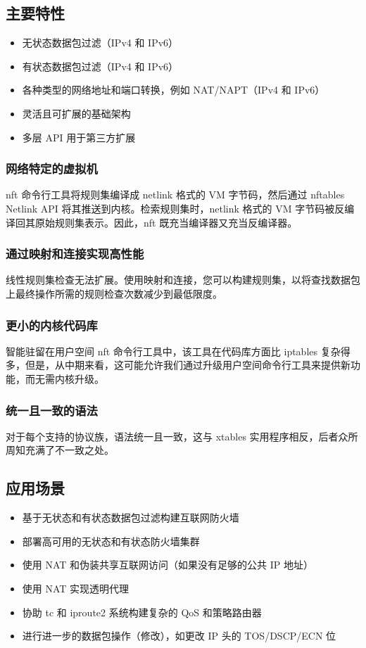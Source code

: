 \documentclass[12pt,UTF8]{ctexbook}
\begin{document}
\subsection{主要特性}
\begin{itemize}
  \item 无状态数据包过滤（IPv4 和 IPv6）
  \item 有状态数据包过滤（IPv4 和 IPv6）
  \item 各种类型的网络地址和端口转换，例如 NAT/NAPT（IPv4 和 IPv6）
  \item 灵活且可扩展的基础架构
  \item 多层 API 用于第三方扩展
\end{itemize}

\subsubsection{网络特定的虚拟机}
nft 命令行工具将规则集编译成 netlink 格式的 VM 字节码，然后通过 nftables Netlink API 将其推送到内核。检索规则集时，netlink 格式的 VM 字节码被反编译回其原始规则集表示。因此，nft 既充当编译器又充当反编译器。

\subsubsection{通过映射和连接实现高性能}
线性规则集检查无法扩展。使用映射和连接，您可以构建规则集，以将查找数据包上最终操作所需的规则检查次数减少到最低限度。

\subsubsection{更小的内核代码库}
智能驻留在用户空间 nft 命令行工具中，该工具在代码库方面比 iptables 复杂得多，但是，从中期来看，这可能允许我们通过升级用户空间命令行工具来提供新功能，而无需内核升级。

\subsubsection{统一且一致的语法}
对于每个支持的协议族，语法统一且一致，这与 xtables 实用程序相反，后者众所周知充满了不一致之处。

\subsection{应用场景}
\begin{itemize}
  \item 基于无状态和有状态数据包过滤构建互联网防火墙
  \item 部署高可用的无状态和有状态防火墙集群
  \item 使用 NAT 和伪装共享互联网访问（如果没有足够的公共 IP 地址）
  \item 使用 NAT 实现透明代理
  \item 协助 tc 和 iproute2 系统构建复杂的 QoS 和策略路由器
  \item 进行进一步的数据包操作（修改），如更改 IP 头的 TOS/DSCP/ECN 位
\end{itemize}
\end{document}
